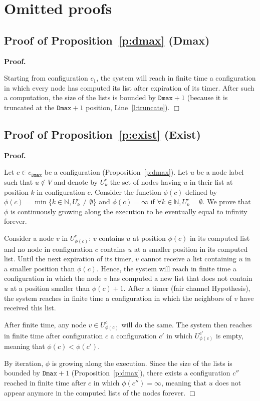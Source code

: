 \documentclass[11pt,english]{article}
\newenvironment{proof}[1][0cm]{
  \begin{list}{\bf Proof.~}{
      \setlength{\itemindent}{0cm}
      \setlength{\labelsep}{0cm}
      \setlength{\labelwidth}{#1}
      \setlength{\leftmargin}{#1}
    \item
    }
}{\hfill$\Box$
  \end{list}
}
\begin{document}
\label{sec:biblio}

\newpage


\mbox{}
\vspace{1cm}
\appendix


\section{Omitted proofs}

\subsection{Proof of Proposition~\ref{p:dmax} (Dmax)}
\begin{proof}
 Starting from configuration $c_1$, the system will reach in finite time a
 configuration in which every node has computed its list after expiration of its
 timer. After such a computation, the size of the lists is bounded by
 $\texttt{Dmax}+1$ (because it is truncated at the $\texttt{Dmax}+1$ position,
 Line~\ref{l:truncate}).
 \end{proof}


\subsection{Proof of  Proposition~\ref{p:exist} (Exist)}

\begin{proof}
Let $c \in e_\texttt{Dmax}$ be a configuration (Proposition~\ref{p:dmax}).
Let $u$ be a node label such that $u \not\in V$ and denote by $U_k^c$ the set of
nodes having $u$ in their list at position $k$ in configuration $c$.  Consider
the function $\phi(c)$ defined by $\phi(c) = \min \{ k\in\mathbb{N}, U_k^c \neq
\emptyset \}$ and $\phi(c) = \infty$ if $\forall k \in \mathbb{N}, U_k^c =
\emptyset$. We prove that $\phi$ is continuously growing along the execution to
be eventually equal to infinity forever.

Consider a node $v$ in $U^{c}_{\phi(c)}$: $v$ contains $u$ at position
$\phi(c)$ in its computed list and no node in configuration $c$ contains $u$
at a smaller position in its computed list. Until the next expiration of its
timer, $v$ cannot receive a list containing $u$ in a smaller position than
$\phi(c)$.
Hence, the system will reach in finite time a configuration in which the node
$v$ has computed a new list that does not contain $u$ at a position smaller than
$\phi(c)+1$. After a timer (fair channel Hypothesis), the system reaches in
finite time a configuration in which the neighbors of $v$ have received this
list.

After finite time, any node $v \in U^{c}_{\phi(c)}$ will do the same. The system
then reaches in finite time after configuration $c$ a configuration $c'$ in
which $U^{c'}_{\phi(c)}$ is empty, meaning that $\phi(c) < \phi(c')$.

By iteration, $\phi$ is growing along the execution.  Since the size of the
lists is bounded by $\texttt{Dmax}+1$ (Proposition~\ref{p:dmax}), there exists a
configuration $c''$ reached in finite time after $c$ in which $\phi(c'') =
\infty$, meaning that $u$ does not appear anymore in the computed lists of the
nodes forever.
\end{proof}
\end{document}
